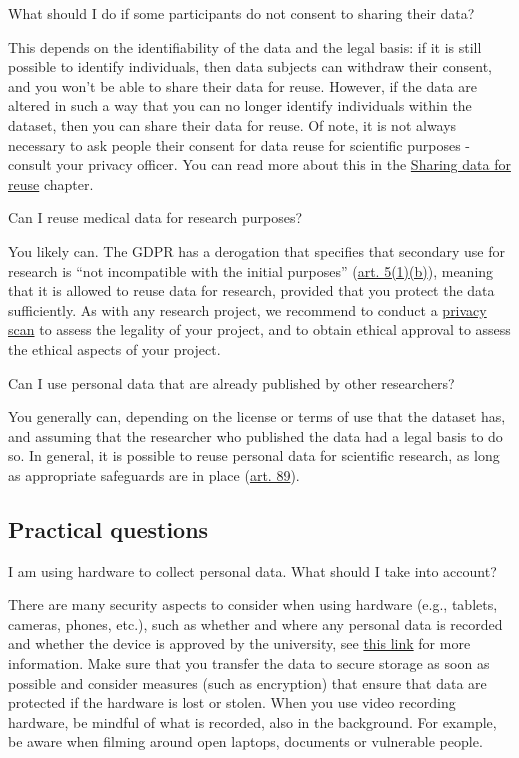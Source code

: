 \documentclass[
]{book}
\begin{document}
What should I do if some participants do not consent to sharing their data?

This depends on the identifiability of the data and the legal basis: if it is still possible to identify individuals, then data subjects can withdraw their consent, and you won't be able to share their data for reuse. However, if the data are altered in such a way that you can no longer identify individuals within the dataset, then you can share their data for reuse. Of note, it is not always necessary to ask people their consent for data reuse for scientific purposes - consult your privacy officer. You can read more about this in the \protect\hyperlink{data-sharing-reuse}{Sharing data for reuse} chapter.

Can I reuse medical data for research purposes?

You likely can. The GDPR has a derogation that specifies that secondary use for research is ``not incompatible with the initial purposes'' (\href{https://gdpr-info.eu/art-5-gdpr/}{art. 5(1)(b)}), meaning that it is allowed to reuse data for research, provided that you protect the data sufficiently. As with any research project, we recommend to conduct a \protect\hyperlink{privacy-scan}{privacy scan} to assess the legality of your project, and to obtain ethical approval to assess the ethical aspects of your project.

Can I use personal data that are already published by other researchers?

You generally can, depending on the license or terms of use that the dataset has, and assuming that the researcher who published the data had a legal basis to do so. In general, it is possible to reuse personal data for scientific research, as long as appropriate safeguards are in place (\href{https://gdpr-info.eu/art-89-gdpr/}{art. 89}).

\hypertarget{practical-questions}{%
\subsection{Practical questions}\label{practical-questions}}

I am using hardware to collect personal data. What should I take into account?

There are many security aspects to consider when using hardware (e.g., tablets, cameras, phones, etc.), such as whether and where any personal data is recorded and whether the device is approved by the university, see \href{https://students.uu.nl/en/practical-information/it-facilities/information-security-at-the-uu}{this link} for more information. Make sure that you transfer the data to secure storage as soon as possible and consider measures (such as encryption) that ensure that data are protected if the hardware is lost or stolen. When you use video recording hardware, be mindful of what is recorded, also in the background. For example, be aware when filming around open laptops, documents or vulnerable people.
\end{document}
